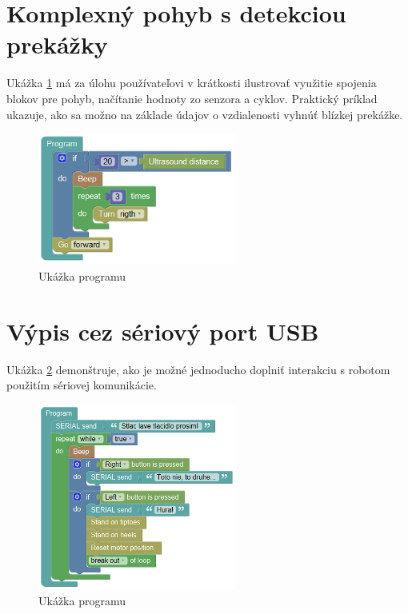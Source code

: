 \newpage

\section{Komplexný pohyb s detekciou prekážky}

Ukážka \ref{obr:avoid-collision} má za úlohu používateľovi v krátkosti ilustrovať využitie spojenia blokov pre pohyb, načítanie hodnoty zo senzora a cyklov. Praktický príklad ukazuje, ako sa možno na základe údajov o vzdialenosti vyhnúť blízkej prekážke.

\begin{figure}[h!]
\centerline{\includegraphics[width=0.58\textwidth]{images/avoid-collision}}
\caption[Ukážka programu ]{Ukážka programu }
\label{obr:avoid-collision}
\end{figure}

\section{Výpis cez sériový port USB}

Ukážka \ref{obr:push-button} demonštruje, ako je možné jednoducho doplniť interakciu s robotom použitím sériovej komunikácie.

\begin{figure}[h!]
\centerline{\includegraphics[width=0.58\textwidth]{images/push-button}}
\caption[Ukážka programu ]{Ukážka programu }
\label{obr:push-button}
\end{figure}

